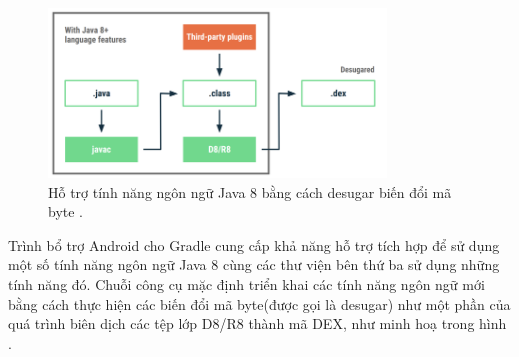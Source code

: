        \begin{figure}[H]
            \centering
            \includegraphics[width=0.8\textwidth]{images/javainandroid.png}
            \caption{Hỗ trợ tính năng ngôn ngữ Java 8 bằng cách desugar biến đổi mã byte \cite{java8}.}
            \label{fig:android2}
        \end{figure}
        
        Trình bổ trợ Android cho Gradle cung cấp khả năng hỗ trợ tích hợp để sử dụng một số tính năng ngôn ngữ Java 8 cùng các thư viện bên thứ ba sử dụng những tính năng đó. Chuỗi công cụ mặc định triển khai các tính năng ngôn ngữ mới bằng cách thực hiện các biến đổi mã byte(được gọi là desugar) như một phần của quá trình biên dịch các tệp lớp D8/R8 thành mã DEX, như minh hoạ trong hình \cite{java8}.

